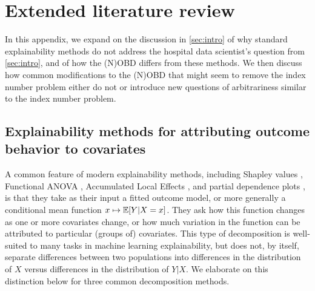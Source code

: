 \section{Extended literature review}
\label{appendix:lit_review_xAI}

In this appendix, we expand on the discussion in \cref{sec:intro} of why standard explainability methods do not address the hospital data scientist's question from \cref{sec:intro}, and of how the (N)OBD differs from these methods.
We then discuss how common modifications to the (N)OBD that might seem to remove the index number problem either do not or introduce new questions of arbitrariness similar to the index number problem.

\subsection{Explainability methods for attributing outcome behavior to covariates}
\label{appendix:xAI}

A common feature of modern explainability methods, including Shapley values \citep{Shapley1953, Lundberg2017, chen2025shapley}, Functional ANOVA \citep{stone1994, hooker2004discovering, hookerGeneralizedFunctionalANOVA2007, lengerich2020purifying, fumagalli2025fanova}, Accumulated Local Effects \citep{apley2020}, and partial dependence plots \citep{friedman2001greedy, liu2025trees}, is that they take as their input a fitted outcome model, or more generally a conditional mean function $x \mapsto \mathbb{E}[Y|X=x]$.
They ask how this function changes as one or more covariates change, or how much variation in the function can be attributed to particular (groups of) covariates.
This type of decomposition is well-suited to many tasks in machine learning explainability, but does not, by itself, separate differences between two populations into differences in the distribution of $X$ versus differences in the distribution of $Y|X$.
We elaborate on this distinction below for three common decomposition methods.

